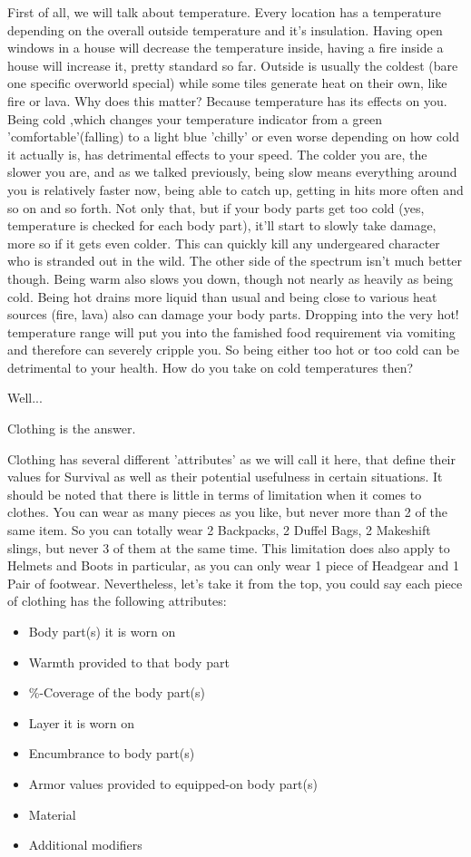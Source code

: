 First of all, we will talk about temperature. Every location has a temperature depending on the overall outside temperature and it's insulation. Having open windows in a house will decrease the temperature inside, having a fire inside a house will increase it, pretty standard so far. Outside is usually the coldest (bare one specific overworld special) while some tiles generate heat on their own, like fire or lava. Why does this matter? Because temperature has its effects on you. Being cold ,which changes your temperature indicator from a green 'comfortable'(falling) to a light blue 'chilly' or even worse depending on how cold it actually is, has detrimental effects to your speed. The colder you are, the slower you are, and as we talked previously, being slow means everything around you is relatively faster now, being able to catch up, getting in hits more often and so on and so forth. Not only that, but if your body parts get too cold (yes, temperature is checked for each body part), it'll start to slowly take damage, more so if it gets even colder. This can quickly kill any undergeared character who is stranded out in the wild. The other side of the spectrum isn't much better though. Being warm also slows you down, though not nearly as heavily as being cold. Being hot drains more liquid than usual and being close to various heat sources (fire, lava) also can damage your body parts. Dropping into the very hot! temperature range will put you into the famished food requirement via vomiting and therefore can severely cripple you. So being either too hot or too cold can be detrimental to your health. How do you take on cold temperatures then?

Well...

Clothing is the answer.

Clothing has several different 'attributes' as we will call it here, that define their values for Survival as well as their potential usefulness in certain situations. It should be noted that there is little in terms of limitation when it comes to clothes. You can wear as many pieces as you like, but never more than 2 of the same item. So you can totally wear 2 Backpacks, 2 Duffel Bags, 2 Makeshift slings, but never 3 of them at the same time. This limitation does also apply to Helmets and Boots in particular, as you can only wear 1 piece of Headgear and 1 Pair of footwear.
Nevertheless, let's take it from the top, you could say each piece of clothing has the following attributes:
\begin{itemize}
\item Body part(s) it is worn on
\item Warmth provided to that body part
\item \%-Coverage of the body part(s)
\item Layer it is worn on
\item Encumbrance to body part(s)
\item Armor values provided to equipped-on body part(s)
\item Material
\item Additional modifiers
\end{itemize}

